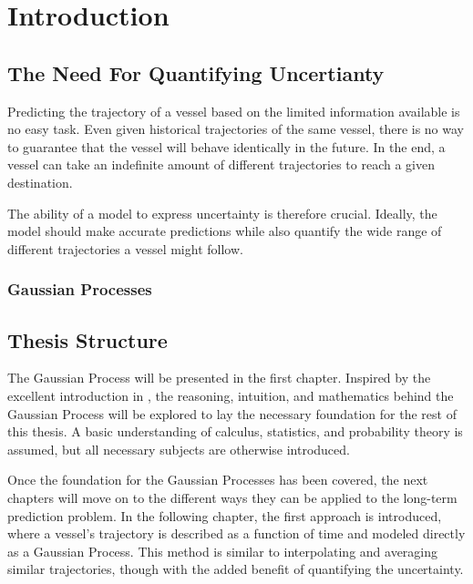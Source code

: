 \chapter{Introduction}
\section{The Need For Quantifying Uncertianty}
Predicting the trajectory of a vessel based on the limited information available is no easy task. Even given historical trajectories of the same vessel, there is no way to guarantee that the vessel will behave identically in the future. In the end, a vessel can take an indefinite amount of different trajectories to reach a given destination. 

The ability of a model to express uncertainty is therefore crucial. Ideally, the model should make accurate predictions while also quantify the wide range of different trajectories a vessel might follow. 

\subsection{Gaussian Processes}







\section{Thesis Structure}
The Gaussian Process will be presented in the first chapter. Inspired by the excellent introduction in \cite{rasmussen}, the reasoning, intuition, and mathematics behind the Gaussian Process will be explored to lay the necessary foundation for the rest of this thesis. A basic understanding of calculus, statistics, and probability theory is assumed, but all necessary subjects are otherwise introduced.  

Once the foundation for the Gaussian Processes has been covered, the next chapters will move on to the different ways they can be applied to the long-term prediction problem. In the following chapter, the first approach is introduced, where a vessel's trajectory is described as a function of time and modeled directly as a Gaussian Process. This method is similar to interpolating and averaging similar trajectories, though with the added benefit of quantifying the uncertainty.

